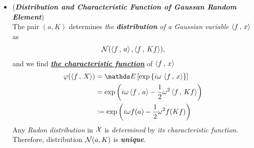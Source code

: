 \documentclass[11pt]{article}
\begin{document}
\begin{itemize}
\item \begin{remark} (\emph{\textbf{Distribution and Characteristic Function of Gaussan Random Element}})\\
The pair $(a, K)$ determines \emph{the \textbf{distribution} of a Gaussian variable} $\left\langle f\,,\, x \right\rangle$ as
\begin{align*}
{\mathcal N}(\left\langle f\,,\, a \right\rangle,  \left\langle f\,,\, Kf \right\rangle),
\end{align*}
and we find \underline{\emph{\textbf{the characteristic function}}} of $\left\langle f\,,\, x \right\rangle$ 
\begin{align*}
\varphi(\inn{f}{X}) &= \E{}{\exp\set{i\omega \, \inn{f}{x}}}\\
&= \exp\paren{i\omega \inn{f}{a} - \frac{1}{2}\omega^{2} \inn{f}{Kf}} \\
&:=  \exp\paren{i\omega f(a) - \frac{1}{2}\omega^{2} f(Kf)}
\end{align*}
Any \emph{Radon distribution} in ${\mathcal X}$ is \emph{determined} by \emph{its characteristic function}. Therefore, distribution ${\mathcal N}(a, K)$ is \emph{\textbf{unique}}.
\end{remark}

%

%
%

\end{itemize}
\end{document}
